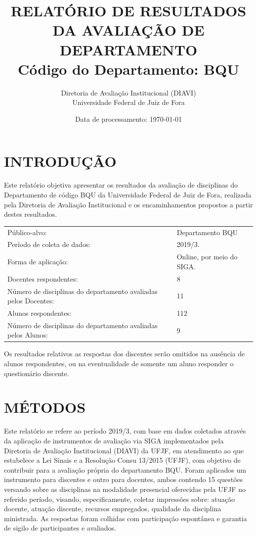 \documentclass[a4paper,10pt]{article}
\date{Data de processamento: \today}
\begin{document}
\author{Diretoria de Avaliação Institucional (DIAVI) \\ Universidade Federal de Juiz de Fora}

\title{RELATÓRIO DE RESULTADOS DA AVALIAÇÃO DE DEPARTAMENTO\\ Código do Departamento: BQU}
\maketitle
\section{INTRODUÇÃO}
Este relatório objetiva apresentar os resultados da avaliação de disciplinas do Departamento     de código BQU da Universidade Federal de Juiz de Fora, realizada pela     Diretoria de Avaliação Institucional e os encaminhamentos propostos a     partir destes resultados.

\begin{center}
\begin{tabularx}{\linewidth}{X|l}

Público-alvo:& Departamento  BQU\\

Período de coleta de dados:& 2019/3.\\

Forma de aplicação:& Online, por meio do SIGA.\\

Docentes respondentes:& 8\\

Número de disciplinas do departamento avaliadas pelos Docentes:& 11\\

Alunos   respondentes:& 112\\

Número de disciplinas do departamento  avaliadas pelos   Alunos:& 9\\
\end{tabularx}
\end{center}

Os resultados relativos as respostas dos discentes serão omitidos na ausência de alunos respondentes, ou na eventualidade de somente um aluno responder o questionário discente.
\section{MÉTODOS}
Este relatório se refere ao período 2019/3, com base em dados     coletados através da aplicação de instrumentos de avaliação via SIGA     implementados pela Diretoria de Avaliação Institucional (DIAVI) da UFJF, em atendimento     ao que estabelece a Lei Sinais e a Resolução Consu 13/2015 (UFJF),     com objetivo de contribuir para a avaliação própria do departamento BQU.    Foram aplicados um instrumento para discentes e outro para docentes, ambos contendo     15 questões versando sobre as disciplinas na modalidade presencial oferecidas pela UFJF no     referido período, visando, especificamente, coletar impressões sobre: atuação docente, atuação discente,     recursos empregados, qualidade da disciplina ministrada.     As respostas foram colhidas      com participação espontânea e garantia de    sigilo de participantes e avaliados.
\end{document}
